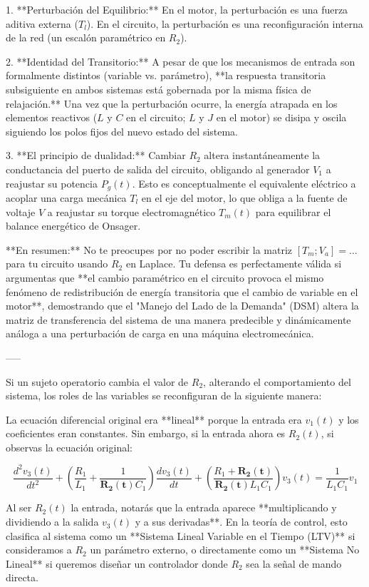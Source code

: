 \documentclass[11pt, a4paper]{article}
\theoremstyle{definition}
\theoremstyle{plain}
\theoremstyle{plain}
\theoremstyle{remark}
\theoremstyle{remark}
\theoremstyle{remark}
\begin{document}
1. **Perturbación del Equilibrio:** En el motor, la perturbación es una fuerza aditiva externa ($T_l$). En el circuito, la perturbación es una reconfiguración interna de la red (un escalón paramétrico en $R_2$).

2. **Identidad del Transitorio:** A pesar de que los mecanismos de entrada son formalmente distintos (variable vs. parámetro), **la respuesta transitoria subsiguiente en ambos sistemas está gobernada por la misma física de relajación.** Una vez que la perturbación ocurre, la energía atrapada en los elementos reactivos ($L$ y $C$ en el circuito; $L$ y $J$ en el motor) se disipa y oscila siguiendo los polos fijos del nuevo estado del sistema.

3. **El principio de dualidad:** Cambiar $R_2$ altera instantáneamente la conductancia del puerto de salida del circuito, obligando al generador $V_1$ a reajustar su potencia $P_g(t)$. Esto es conceptualmente el equivalente eléctrico a acoplar una carga mecánica $T_l$ en el eje del motor, lo que obliga a la fuente de voltaje $V$ a reajustar su torque electromagnético $T_m(t)$ para equilibrar el balance energético de Onsager.

**En resumen:** No te preocupes por no poder escribir la matriz $[T_m; V_a] = \dots$ para tu circuito usando $R_2$ en Laplace. Tu defensa es perfectamente válida si argumentas que **el cambio paramétrico en el circuito provoca el mismo fenómeno de redistribución de energía transitoria que el cambio de variable en el motor**, demostrando que el "Manejo del Lado de la Demanda" (DSM) altera la matriz de transferencia del sistema de una manera predecible y dinámicamente análoga a una perturbación de carga en una máquina electromecánica.

-----

Si un sujeto operatorio cambia el valor de $R_2$, alterando el comportamiento del sistema, los roles de las variables se reconfiguran de la siguiente manera:

La ecuación diferencial original era **lineal** porque la entrada era $v_1(t)$ y los coeficientes eran constantes. Sin embargo, si la entrada ahora es $R_2(t)$, si observas la ecuación original:

$$\frac{d^2v_3(t)}{dt^2} + \left( \frac{R_1}{L_1} + \frac{1}{\mathbf{R_2(t)}C_1} \right) \frac{dv_3(t)}{dt} + \left( \frac{R_1 + \mathbf{R_2(t)}}{\mathbf{R_2(t)}L_1C_1} \right) v_3(t) = \frac{1}{L_1C_1} v_1$$

Al ser $R_2(t)$ la entrada, notarás que la entrada aparece **multiplicando y dividiendo a la salida $v_3(t)$ y a sus derivadas**. En la teoría de control, esto clasifica al sistema como un **Sistema Lineal Variable en el Tiempo {\color{red} (LTV)}** si consideramos a $R_2$ un parámetro externo, o directamente como un **Sistema No Lineal** si queremos diseñar un controlador donde $R_2$ sea la señal de mando directa.
\end{document}
